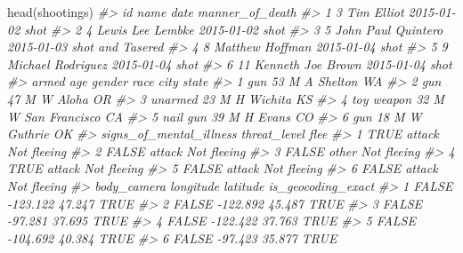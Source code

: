 \documentclass[
  12pt,
  openany]{book}
\newenvironment{Shaded}{\begin{snugshade}}{\end{snugshade}}
\newcommand{\CommentTok}[1]{\textcolor[rgb]{0.37,0.37,0.37}{\textit{#1}}}
\newcommand{\FunctionTok}[1]{\textcolor[rgb]{0,0,0}{#1}}
\newcommand{\NormalTok}[1]{#1}
\begin{document}
\begin{Shaded}
\begin{Highlighting}[]
\FunctionTok{head}\NormalTok{(shootings)}
\CommentTok{\#\textgreater{}   id               name       date  manner\_of\_death}
\CommentTok{\#\textgreater{} 1  3         Tim Elliot 2015{-}01{-}02             shot}
\CommentTok{\#\textgreater{} 2  4   Lewis Lee Lembke 2015{-}01{-}02             shot}
\CommentTok{\#\textgreater{} 3  5 John Paul Quintero 2015{-}01{-}03 shot and Tasered}
\CommentTok{\#\textgreater{} 4  8    Matthew Hoffman 2015{-}01{-}04             shot}
\CommentTok{\#\textgreater{} 5  9  Michael Rodriguez 2015{-}01{-}04             shot}
\CommentTok{\#\textgreater{} 6 11  Kenneth Joe Brown 2015{-}01{-}04             shot}
\CommentTok{\#\textgreater{}        armed age gender race          city state}
\CommentTok{\#\textgreater{} 1        gun  53      M    A       Shelton    WA}
\CommentTok{\#\textgreater{} 2        gun  47      M    W         Aloha    OR}
\CommentTok{\#\textgreater{} 3    unarmed  23      M    H       Wichita    KS}
\CommentTok{\#\textgreater{} 4 toy weapon  32      M    W San Francisco    CA}
\CommentTok{\#\textgreater{} 5   nail gun  39      M    H         Evans    CO}
\CommentTok{\#\textgreater{} 6        gun  18      M    W       Guthrie    OK}
\CommentTok{\#\textgreater{}   signs\_of\_mental\_illness threat\_level        flee}
\CommentTok{\#\textgreater{} 1                    TRUE       attack Not fleeing}
\CommentTok{\#\textgreater{} 2                   FALSE       attack Not fleeing}
\CommentTok{\#\textgreater{} 3                   FALSE        other Not fleeing}
\CommentTok{\#\textgreater{} 4                    TRUE       attack Not fleeing}
\CommentTok{\#\textgreater{} 5                   FALSE       attack Not fleeing}
\CommentTok{\#\textgreater{} 6                   FALSE       attack Not fleeing}
\CommentTok{\#\textgreater{}   body\_camera longitude latitude is\_geocoding\_exact}
\CommentTok{\#\textgreater{} 1       FALSE  {-}123.122   47.247               TRUE}
\CommentTok{\#\textgreater{} 2       FALSE  {-}122.892   45.487               TRUE}
\CommentTok{\#\textgreater{} 3       FALSE   {-}97.281   37.695               TRUE}
\CommentTok{\#\textgreater{} 4       FALSE  {-}122.422   37.763               TRUE}
\CommentTok{\#\textgreater{} 5       FALSE  {-}104.692   40.384               TRUE}
\CommentTok{\#\textgreater{} 6       FALSE   {-}97.423   35.877               TRUE}
\end{Highlighting}
\end{Shaded}
\end{document}

